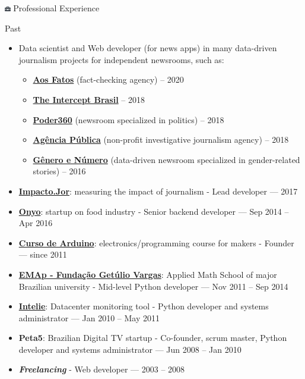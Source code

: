\documentclass[a4paper,11pt]{article}
\begin{document}
\begin{section}{\includegraphics[height=0.6em]{icon-work} Professional Experience}
	\begin{subsection}{Past}
		\begin{itemize}
			\item Data scientist and Web developer (for news apps) in many
				data-driven journalism projects for independent newsrooms, such
				as:
				\begin{itemize}
					\item \href{https://aosfatos.org/radar/}{\textbf{Aos Fatos}}
						(fact-checking agency) -- 2020
					\item
						\href{https://theintercept.com/2018/04/03/exercito-rio-empresa-investigada/}{\textbf{The
						Intercept Brasil}} -- 2018
					\item
						\href{https://eleicoes.poder360.com.br}{\textbf{Poder360}}
						(newsroom specialized in politics) -- 2018
					\item
						\href{https://theintercept.com/2018/04/03/exercito-rio-empresa-investigada/}{\textbf{Agência
						Pública}} (non-profit investigative journalism agency) -- 2018
					\item
						\href{http://www.generonumero.media/candidatura-semvoto-eleicoes2018/}{\textbf{Gênero
						e Número}} (data-driven newsroom specialized in
						gender-related stories) -- 2016
				\end{itemize}
			\item \href{https://impacto.jor.br}{\textbf{Impacto.Jor}}:
				measuring the impact of journalism - Lead developer --- 2017
			\item \href{http://onyo.com}{\textbf{Onyo}}: startup on food
				industry - Senior backend developer --- Sep 2014 -- Apr 2016
			\item \href{http://www.cursodearduino.com.br/}{\textbf{Curso de
				Arduino}}: electronics/programming course for makers -
				Founder --- since 2011
			\item \href{http://emap.fgv.br/}{\textbf{EMAp - Fundação Getúlio
				Vargas}}: Applied Math School of major Brazilian university -
				Mid-level Python developer --- Nov 2011 -- Sep 2014
			\item \href{http://www.intelie.com.br/}{\textbf{Intelie}}:
				Datacenter monitoring tool - Python developer and systems
				administrator --- Jan 2010 -- May 2011
			\item \textbf{Peta5}: Brazilian Digital TV startup - Co-founder,
				scrum master, Python developer and systems administrator ---
				Jun 2008 -- Jan 2010
			\item \textbf{\textit{Freelancing}} - Web developer --- 2003 -- 2008
		\end{itemize}
	\end{subsection}
\end{section}
\end{document}
